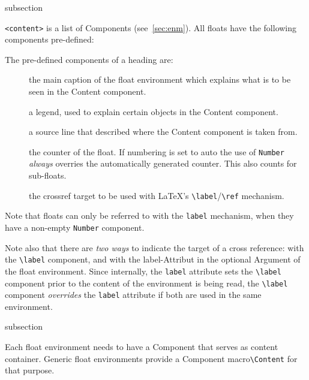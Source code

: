 \begin{Heading}[label=sec:flt:comp]{subsection}
\end{Heading}

\lstinline{<content>} is a list of Components (see~\ref{sec:enm}). All
floats have the following components pre-defined:

The pre-defined components of a heading are:
\begin{description}
\item[\string\Caption]
  the main caption of the float environment which explains what is to
  be seen in the Content component.
\item[\string\Legend]
  a legend, used to explain certain objects in the Content component.
\item[\string\Source]
  a source line that described where the Content component is taken from.
\item[\string\Number]
  the counter of the float. If numbering is set to auto the use of
  \lstinline{Number} \textit{always} overries the automatically
  generated counter. This also counts for sub-floats.
\item[\string\label]
  the crossref target to be used with \LaTeX's
  \lstinline{\label}/\lstinline{\ref} mechanism.
\end{description}
Note that floats can only be referred to with the \lstinline{label}
mechanism, when they have a non-empty \lstinline{Number} component.

Note also that there are \textit{two ways} to indicate the target of a
cross reference: with the \lstinline{\label} component, and with the
label-Attribut in the optional Argument of the float
environment. Since internally, the \lstinline{label} attribute sets
the \lstinline{\label} component prior to the content of the
environment is being read, the \lstinline{\label} component
\textit{overrides} the \lstinline{label} attribute if both are used in
the same environment.


\begin{Heading}[label=sec:flt:content]{subsection}
\end{Heading}

Each float environment needs to have a Component that serves as
content container. Generic float environments provide a Component
macro\lstinline{\Content}%
 for that
purpose.

